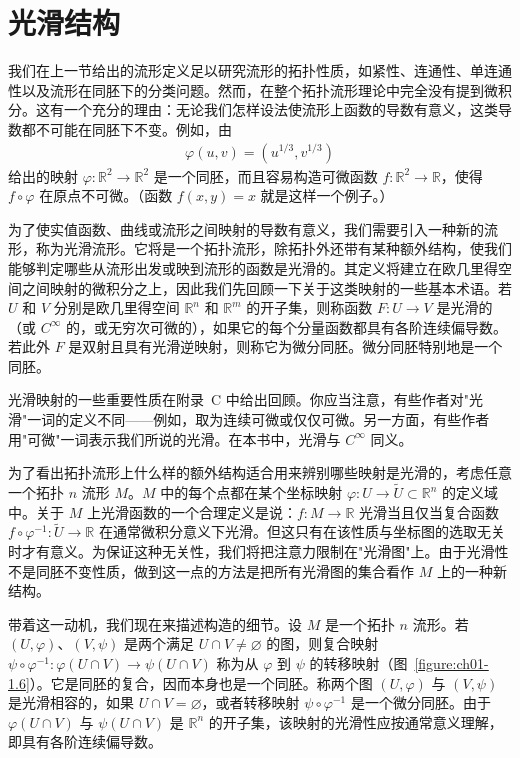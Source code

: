 \documentclass[../../main.tex]{subfiles}
\begin{document}
\section{光滑结构}\label{section:ch01-光滑结构}

我们在上一节给出的流形定义足以研究流形的拓扑性质，如紧性、连通性、单连通性以及流形在同胚下的分类问题。然而，在整个拓扑流形理论中完全没有提到微积分。这有一个充分的理由：无论我们怎样设法使流形上函数的导数有意义，这类导数都不可能在同胚下不变。例如，由
\begin{align*}
\varphi(u,v)=(u^{1/3},v^{1/3})
\end{align*}
给出的映射 $\varphi:\mathbb{R}^{2}\to\mathbb{R}^{2}$ 是一个同胚，而且容易构造可微函数 $f:\mathbb{R}^{2}\to\mathbb{R}$，使得 $f\circ\varphi$ 在原点不可微。（函数 $f(x,y)=x$ 就是这样一个例子。）

为了使实值函数、曲线或流形之间映射的导数有意义，我们需要引入一种新的流形，称为光滑流形。它将是一个拓扑流形，除拓扑外还带有某种额外结构，使我们能够判定哪些从流形出发或映到流形的函数是光滑的。其定义将建立在欧几里得空间之间映射的微积分之上，因此我们先回顾一下关于这类映射的一些基本术语。若 $U$ 和 $V$ 分别是欧几里得空间 $\mathbb{R}^{n}$ 和 $\mathbb{R}^{m}$ 的开子集，则称函数 $F:U\to V$ 是光滑的（或 $C^{\infty}$ 的，或无穷次可微的），如果它的每个分量函数都具有各阶连续偏导数。若此外 $F$ 是双射且具有光滑逆映射，则称它为微分同胚。微分同胚特别地是一个同胚。

光滑映射的一些重要性质在附录~C 中给出回顾。你应当注意，有些作者对"光滑"一词的定义不同——例如，取为连续可微或仅仅可微。另一方面，有些作者用"可微"一词表示我们所说的光滑。在本书中，光滑与 $C^{\infty}$ 同义。

为了看出拓扑流形上什么样的额外结构适合用来辨别哪些映射是光滑的，考虑任意一个拓扑 $n$ 流形 $M$。$M$ 中的每个点都在某个坐标映射 $\varphi:U\to\widetilde{U}\subset\mathbb{R}^{n}$ 的定义域中。关于 $M$ 上光滑函数的一个合理定义是说：$f:M\to\mathbb{R}$ 光滑当且仅当复合函数 $f\circ\varphi^{-1}:\widetilde{U}\to\mathbb{R}$ 在通常微积分意义下光滑。但这只有在该性质与坐标图的选取无关时才有意义。为保证这种无关性，我们将把注意力限制在"光滑图"上。由于光滑性不是同胚不变性质，做到这一点的方法是把所有光滑图的集合看作 $M$ 上的一种新结构。

带着这一动机，我们现在来描述构造的细节。设 $M$ 是一个拓扑 $n$ 流形。若 $(U,\varphi)$、$(V,\psi)$ 是两个满足 $U\cap V\neq\varnothing$ 的图，则复合映射 $\psi\circ\varphi^{-1}:\varphi(U\cap V)\to\psi(U\cap V)$ 称为从 $\varphi$ 到 $\psi$ 的转移映射（图~\cref{figure:ch01-1.6}）。它是同胚的复合，因而本身也是一个同胚。称两个图 $(U,\varphi)$ 与 $(V,\psi)$ 是光滑相容的，如果 $U\cap V=\varnothing$，或者转移映射 $\psi\circ\varphi^{-1}$ 是一个微分同胚。由于 $\varphi(U\cap V)$ 与 $\psi(U\cap V)$ 是 $\mathbb{R}^{n}$ 的开子集，该映射的光滑性应按通常意义理解，即具有各阶连续偏导数。
\end{document}

